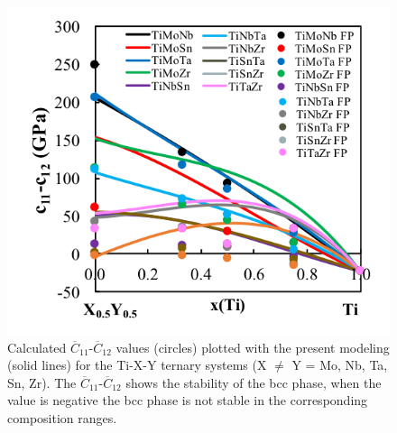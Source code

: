 \pagebreak
\begin{figure}[H]
	\centering
	\includegraphics{Chapter-6/Figures/tixyc11-c12.png}
	\caption{Calculated $\overline{C}_{11}$-$\overline{C}_{12}$ values (circles) plotted with the present modeling (solid lines) for the Ti-X-Y ternary systems (X $\neq$ Y = Mo, Nb, Ta, Sn, Zr). The $\overline{C}_{11}$-$\overline{C}_{12}$ shows the stability of the bcc phase, when the value is negative the bcc phase is not stable in the corresponding composition ranges.}
	\label{Ch6-figure:tixyc11-c12}
\end{figure}


